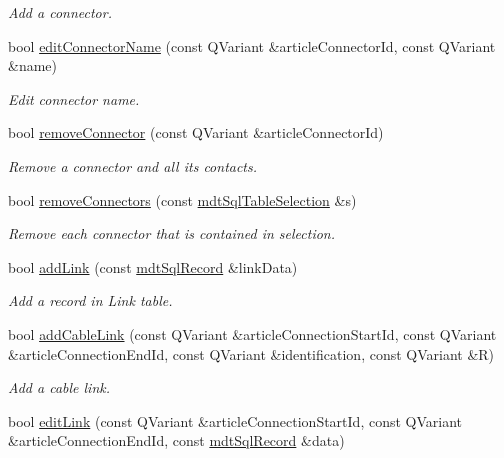 \begin{DoxyCompactItemize}
\begin{DoxyCompactList}\small\item\em Add a connector. \end{DoxyCompactList}\item 
bool \hyperlink{classmdt_cl_article_aed8a2fc638636a618409694a655e9819}{edit\-Connector\-Name} (const Q\-Variant \&article\-Connector\-Id, const Q\-Variant \&name)
\begin{DoxyCompactList}\small\item\em Edit connector name. \end{DoxyCompactList}\item 
bool \hyperlink{classmdt_cl_article_aa675a24b08929b5efb4c421176b8bdde}{remove\-Connector} (const Q\-Variant \&article\-Connector\-Id)
\begin{DoxyCompactList}\small\item\em Remove a connector and all its contacts. \end{DoxyCompactList}\item 
bool \hyperlink{classmdt_cl_article_a85dbe6c2b85d00e0f479c477ee4b7653}{remove\-Connectors} (const \hyperlink{classmdt_sql_table_selection}{mdt\-Sql\-Table\-Selection} \&s)
\begin{DoxyCompactList}\small\item\em Remove each connector that is contained in selection. \end{DoxyCompactList}\item 
bool \hyperlink{classmdt_cl_article_aa438fa2c759a091341eea76ffda6eef3}{add\-Link} (const \hyperlink{classmdt_sql_record}{mdt\-Sql\-Record} \&link\-Data)
\begin{DoxyCompactList}\small\item\em Add a record in Link table. \end{DoxyCompactList}\item 
bool \hyperlink{classmdt_cl_article_a0ed8ad64cafb5b69c1f83875818136e5}{add\-Cable\-Link} (const Q\-Variant \&article\-Connection\-Start\-Id, const Q\-Variant \&article\-Connection\-End\-Id, const Q\-Variant \&identification, const Q\-Variant \&R)
\begin{DoxyCompactList}\small\item\em Add a cable link. \end{DoxyCompactList}\item 
bool \hyperlink{classmdt_cl_article_a3c627720a87e6003bb78c0727ec2ba64}{edit\-Link} (const Q\-Variant \&article\-Connection\-Start\-Id, const Q\-Variant \&article\-Connection\-End\-Id, const \hyperlink{classmdt_sql_record}{mdt\-Sql\-Record} \&data)

\end{DoxyCompactItemize}
